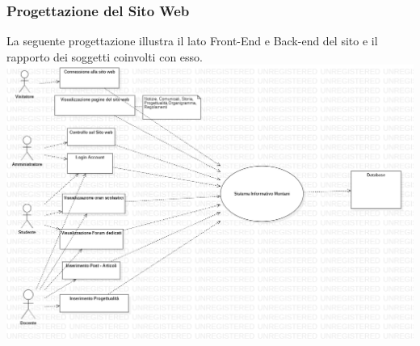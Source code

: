 \documentclass{article}
\begin{document}
	\subsubsection{\textbf{Progettazione del Sito Web}}
	La seguente progettazione illustra il lato Front-End e Back-end del sito e il rapporto dei soggetti coinvolti con esso.	
	\includegraphics[scale=0.35]{UseCaseDiagram.png}
	
\end{document}
